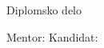 
\begin{center}
  \large
  \univerza

  \fakulteta

  \oddelek
\end{center}

\vspace{3cm}


\begin{center}
  {\Large Diplomsko delo}

  \vspace{1cm}
  {\Huge \bfseries \podnaslov}


    \vspace{5cm}

    \begin{flushleft}
      Mentor:  Kandidat:


      \mentor  {} \kandidat
    \end{flushleft}


    \vspace{3cm}
    {\large \datum}
  \end{center}



